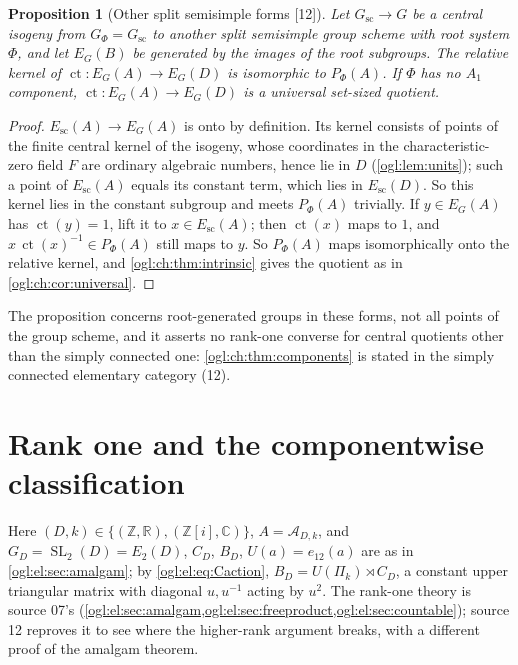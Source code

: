 \documentclass[11pt,oneside]{article}
\numberwithin{equation}{section}
\newtheorem{proposition}[proposition]{Proposition}
\theoremstyle{definition}
\theoremstyle{remark}
\newcommand{\Z}{\mathbb Z}
\newcommand{\R}{\mathbb R}
\newcommand{\C}{\mathbb C}
\newcommand{\A}{\mathcal A}
\newcommand{\ct}{\operatorname{ct}}
\newcommand{\SL}{\operatorname{SL}}
\newcommand{\src}[1]{\textup{\textsf{\small[#1]}}}
\begin{document}
\begin{proposition}[Other split semisimple forms \src{12}]\label{ogl:ch:prop:isogeny}
Let $G_{\mathrm{sc}}\to G$ be a central isogeny from $G_\Phi=G_{\mathrm{sc}}$ to
another split semisimple group scheme with root system $\Phi$, and let
$E_G(B)$ be generated by the images of the root subgroups. The relative kernel
of $\ct:E_G(A)\to E_G(D)$ is isomorphic to $P_\Phi(A)$. If $\Phi$ has no $A_1$
component, $\ct:E_G(A)\to E_G(D)$ is a universal set-sized quotient.
\end{proposition}
\begin{proof}
$E_{\mathrm{sc}}(A)\to E_G(A)$ is onto by definition. Its kernel consists of
points of the finite central kernel of the isogeny, whose coordinates in the
characteristic-zero field $F$ are ordinary algebraic numbers, hence lie in $D$
(\cref{ogl:lem:units}); such a point of $E_{\mathrm{sc}}(A)$ equals its constant
term, which lies in $E_{\mathrm{sc}}(D)$. So this kernel lies in the constant
subgroup and meets $P_\Phi(A)$ trivially. If $y\in E_G(A)$ has $\ct(y)=1$, lift it
to $x\in E_{\mathrm{sc}}(A)$; then $\ct(x)$ maps to $1$, and
$x\,\ct(x)^{-1}\in P_\Phi(A)$ still maps to $y$. So $P_\Phi(A)$ maps
isomorphically onto the relative kernel, and \cref{ogl:ch:thm:intrinsic} gives
the quotient as in \cref{ogl:ch:cor:universal}.
\end{proof}

The proposition concerns root-generated groups in these forms, not all points
of the group scheme, and it asserts no rank-one converse for central quotients
other than the simply connected one: \cref{ogl:ch:thm:components} is stated in
the simply connected elementary category (12).

\section{Rank one and the componentwise classification}\label{ogl:ch:sec:rankone}

Here $(D,k)\in\{(\Z,\R),(\Z[i],\C)\}$, $A=\A_{D,k}$, and $G_D=\SL_2(D)=E_2(D)$,
$C_D$, $B_D$, $U(a)=e_{12}(a)$ are as in \cref{ogl:el:sec:amalgam}; by
\eqref{ogl:el:eq:Caction}, $B_D=U(\Pi_k)\rtimes C_D$, a constant upper triangular
matrix with diagonal $u,u^{-1}$ acting by $u^2$. The rank-one theory is
source 07's (\cref{ogl:el:sec:amalgam,ogl:el:sec:freeproduct,ogl:el:sec:countable});
source 12 reproves it to see where the higher-rank argument breaks, with a
different proof of the amalgam theorem.
\end{document}
